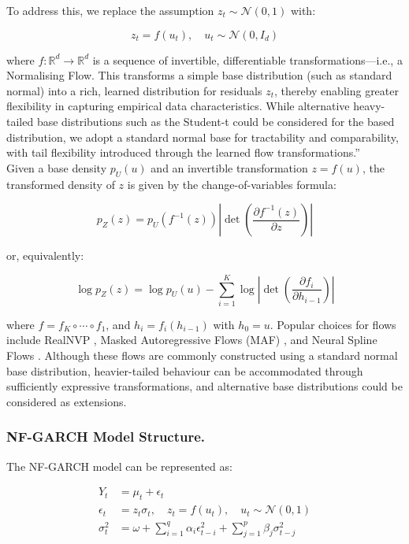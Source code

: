 \documentclass[oneside,12pt]{CUEDthesisPSnPDF}
\newcommand{\parencite}{\citep}
\begin{document}
To address this, we replace the assumption \( z_t \sim \mathcal{N}(0,1) \) with:

\[
z_t = f(u_t), \quad u_t \sim \mathcal{N}(0, I_d)
\]

where \( f: \mathbb{R}^d \rightarrow \mathbb{R}^d \) is a sequence of invertible, differentiable transformations—i.e., a Normalising Flow. This transforms a simple base distribution (such as standard normal) into a rich, learned distribution for residuals \( z_t \), thereby enabling greater flexibility in capturing empirical data characteristics. While alternative heavy-tailed base distributions such as the Student-t could be considered for the based distribution, we adopt a standard normal base for tractability and comparability, with tail flexibility introduced through the learned flow transformations.”\\

Given a base density \( p_U(u) \) and an invertible transformation \( z = f(u) \), the transformed density of \( z \) is given by the change-of-variables formula:

\[
p_Z(z) = p_U(f^{-1}(z)) \left| \det \left( \frac{\partial f^{-1}(z)}{\partial z} \right) \right|
\]

or, equivalently:

\[
\log p_Z(z) = \log p_U(u) - \sum_{i=1}^K \log \left| \det \left( \frac{\partial f_i}{\partial h_{i-1}} \right) \right|
\]

where \( f = f_K \circ \cdots \circ f_1 \), and \( h_i = f_i(h_{i-1}) \) with \( h_0 = u \). Popular choices for flows include RealNVP \parencite{dinh2016density}, Masked Autoregressive Flows (MAF) \parencite{papamakarios2017masked}, and Neural Spline Flows \parencite{durkan2019neural}. Although these flows are commonly constructed using a standard normal base distribution, heavier-tailed behaviour can be accommodated through sufficiently expressive transformations, and alternative base distributions could be considered as extensions.\\

\subsubsection{NF-GARCH Model Structure.} The NF-GARCH model can be represented as:

\begin{align}
Y_t &= \mu_t + \epsilon_t \\
\epsilon_t &= z_t \sigma_t, \quad z_t = f(u_t), \quad u_t \sim \mathcal{N}(0,1) \\
\sigma_t^2 &= \omega + \sum_{i=1}^q \alpha_i \epsilon_{t-i}^2 + \sum_{j=1}^p \beta_j \sigma_{t-j}^2
\end{align}
\end{document}
